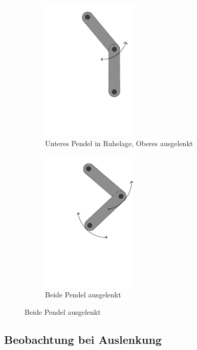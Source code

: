 \documentclass[11pt,a4paper,titlepage, ngerman]{article}
\begin{document}
\begin{figure}[ht]
\begin{subfigure}{0.5\textwidth}
					\centering
					\includegraphics[width=0.5\textwidth]{Doppelpendel_Auslenkung_P1.png}
					\caption{Unteres Pendel in Ruhelage, Oberes ausgelenkt}
					\label{abb:DP_RuntenAoben}
				\end{subfigure}
				\begin{subfigure}{0.5\textwidth}
					\centering
					\includegraphics[width=0.5\textwidth]{Doppelpendel_Auslenkung_beide.png}
					\caption{Beide Pendel ausgelenkt}
					\label{abb:DP_ausgelenkt}
				\end{subfigure}		
			\end{figure}
		
		\subsection{Beobachtung bei Auslenkung}
		
\end{document}
